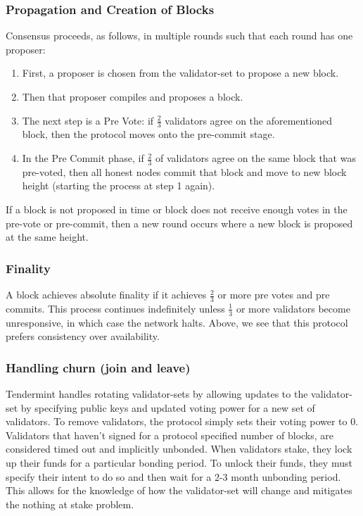 \documentclass[10pt,journal,compsoc]{IEEEtran}
\begin{document}
\subsubsection{Propagation and Creation of Blocks}
Consensus proceeds, as follows, in multiple rounds such that each round has one proposer:
\begin{enumerate}
    \item First, a proposer is chosen from the validator-set to propose a new block.
    \item Then that proposer compiles and proposes a block.
    \item The next step is a Pre Vote: if \(\frac{2}{3}\) validators agree on the aforementioned block, then the protocol moves onto the pre-commit stage.
    \item In the Pre Commit phase, if \(\frac{2}{3}\) of validators agree on the same block that was pre-voted, then all honest nodes commit that block and move to new block height (starting the process at step 1 again).
\end{enumerate}
If a block is not proposed in time or block does not receive enough votes in the pre-vote or pre-commit, then a new round occurs where a new block is proposed at the same height.

\subsubsection{Finality}
A block achieves absolute finality if it achieves \(\frac{2}{3}\) or more pre votes and pre commits. This process continues indefinitely unless \(\frac{1}{3}\) or more validators become unresponsive, in which case the network halts. Above, we see that this protocol prefers consistency over availability.

\subsubsection{Handling churn (join and leave)}
Tendermint handles rotating validator-sets by allowing updates to the validator-set by specifying public keys and updated voting power for a new set of validators. To remove validators, the protocol simply sets their voting power to 0. Validators that haven't signed for a protocol specified number of blocks, are considered timed out and implicitly unbonded. When validators stake, they lock up their funds for a particular bonding period. To unlock their funds, they must specify their intent to do so and then wait for a 2-3 month unbonding period. This allows for the knowledge of how the validator-set will change and mitigates the nothing at stake problem. 
\end{document}
